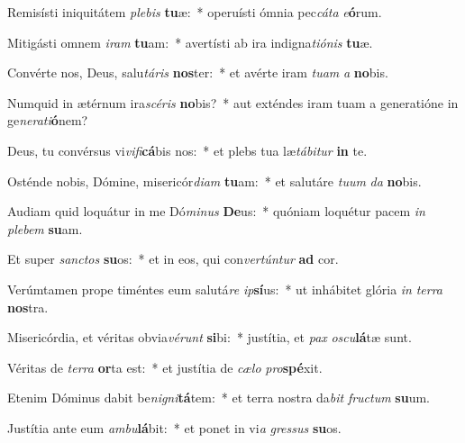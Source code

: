 \item Remisísti iniquitátem \textit{ple}\textit{bis} \textbf{tu}æ:~* operuísti ómnia pec\textit{cá}\textit{ta} \textit{e}\textbf{ó}rum.
\item Mitigásti omnem \textit{i}\textit{ram} \textbf{tu}am:~* avertísti ab ira indigna\textit{ti}\textit{ó}\textit{nis} \textbf{tu}æ.
\item Convérte nos, Deus, salu\textit{tá}\textit{ris} \textbf{nos}ter:~* et avérte iram \textit{tu}\textit{am} \textit{a} \textbf{no}bis.
\item Numquid in ætérnum ira\textit{scé}\textit{ris} \textbf{no}bis?~* aut exténdes iram tuam a generatióne in ge\textit{ne}\textit{ra}\textit{ti}\textbf{ó}nem?
\item Deus, tu convérsus vi\textit{vi}\textit{fi}\textbf{cá}bis nos:~* et plebs tua læ\textit{tá}\textit{bi}\textit{tur} \textbf{in} te.
\item Osténde nobis, Dómine, misericór\textit{di}\textit{am} \textbf{tu}am:~* et salutáre \textit{tu}\textit{um} \textit{da} \textbf{no}bis.
\item Audiam quid loquátur in me Dó\textit{mi}\textit{nus} \textbf{De}us:~* quóniam loquétur pacem \textit{in} \textit{ple}\textit{bem} \textbf{su}am.
\item Et super \textit{sanc}\textit{tos} \textbf{su}os:~* et in eos, qui con\textit{ver}\textit{tún}\textit{tur} \textbf{ad} cor.
\item Verúmtamen prope timéntes eum salutá\textit{re} \textit{ip}\textbf{sí}us:~* ut inhábitet glória \textit{in} \textit{ter}\textit{ra} \textbf{nos}tra.
\item Misericórdia, et véritas obvia\textit{vé}\textit{runt} \textbf{si}bi:~* justítia, et \textit{pax} \textit{os}\textit{cu}\textbf{lá}tæ sunt.
\item Véritas de \textit{ter}\textit{ra} \textbf{or}ta est:~* et justítia de \textit{cæ}\textit{lo} \textit{pro}\textbf{spé}xit.
\item Etenim Dóminus dabit be\textit{ni}\textit{gni}\textbf{tá}tem:~* et terra nostra da\textit{bit} \textit{fruc}\textit{tum} \textbf{su}um.
\item Justítia ante eum \textit{am}\textit{bu}\textbf{lá}bit:~* et ponet in vi\textit{a} \textit{gres}\textit{sus} \textbf{su}os.
